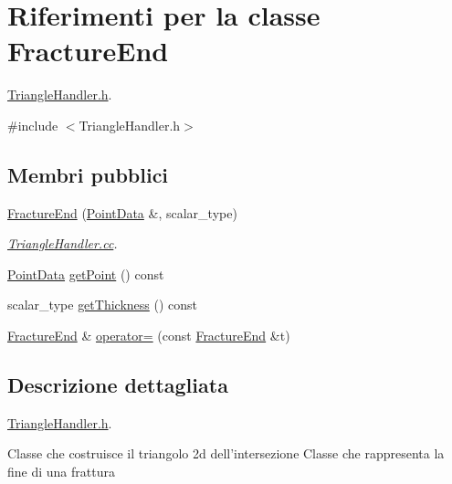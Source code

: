 \hypertarget{classFractureEnd}{\section{Riferimenti per la classe Fracture\-End}
\label{classFractureEnd}
}


\hyperlink{TriangleHandler_8h}{Triangle\-Handler.\-h}.  




{\ttfamily \#include $<$Triangle\-Handler.\-h$>$}

\subsection*{Membri pubblici}
\begin{DoxyCompactItemize}
\item 
\hyperlink{classFractureEnd_a5be0d3eb231ecbc491fb9c07bbe44183}{Fracture\-End} (\hyperlink{classPointData}{Point\-Data} \&, scalar\-\_\-type)
\begin{DoxyCompactList}\small\item\em \hyperlink{TriangleHandler_8cc}{Triangle\-Handler.\-cc}. \end{DoxyCompactList}\item 
\hyperlink{classPointData}{Point\-Data} \hyperlink{classFractureEnd_a48187852ce2e959d00577fe4d66c2e0f}{get\-Point} () const 
\item 
scalar\-\_\-type \hyperlink{classFractureEnd_a2b70172b4593324288f5779b7998d4a3}{get\-Thickness} () const 
\item 
\hyperlink{classFractureEnd}{Fracture\-End} \& \hyperlink{classFractureEnd_a94df97c8e4f3e68a62ebaa3ae754106f}{operator=} (const \hyperlink{classFractureEnd}{Fracture\-End} \&t)
\end{DoxyCompactItemize}


\subsection{Descrizione dettagliata}
\hyperlink{TriangleHandler_8h}{Triangle\-Handler.\-h}. 

Classe che costruisce il triangolo 2d dell'intersezione Classe che rappresenta la fine di una frattura 

